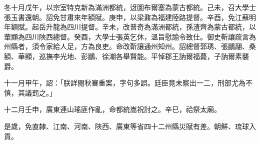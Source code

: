 \begin{pinyinscope}
冬十月戊午，以宗室特克新為滿洲都統，迓圖布爾塞為蒙古都統。己未，召大學士張玉書還朝。詔免甘肅來年額賦。庚申，以梁鼐為福建陸路提督。辛酉，免江蘇明年額賦。起岳升龍為四川提督。辛未，改普奇為滿洲都統，孫渣齊為蒙古都統，以華顯為四川陜西總督。癸酉，大學士張英乞休，溫旨慰諭令致仕。御史靳讓疏言為州縣者，須令家給人足，方為良吏。命改靳讓通州知州。詔總督郭琇、張鵬翮、桑額、華顯，巡撫李光地、彭鵬、徐潮各舉賢能。平悼郡王訥爾福薨，子訥爾素襲爵。

十一月甲午，詔：「朕詳閱秋審重案，字句多誤。廷臣竟未察出一二，刑部尤為不慎，其議罰之。」

十二月壬申，廣東連山瑤匪作亂，命都統嵩祝討之。辛巳，祫祭太廟。

是歲，免直隸、江南、河南、陜西、廣東等省四十二州縣災賦有差。朝鮮、琉球入貢。


\end{pinyinscope}
